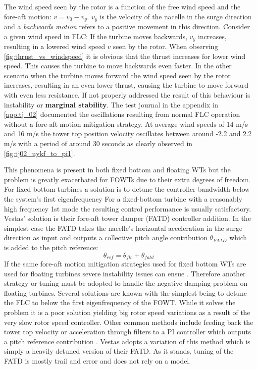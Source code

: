 The wind speed seen by the rotor is a function of the free wind speed and the fore-aft motion: $ v = v_0 - v_y $. $ v_y $ is the velocity of the nacelle in the surge direction and a \textit{backwards motion} refers to a positive movement in this direction. Consider a given wind speed in FLC: If the turbine moves backwards, $ v_y $ increases, resulting in a lowered wind speed $ v $ seen by the rotor. When observing \cref{fig:thrust_vs_windspeed} it is obvious that the thrust increases for lower wind speed. This causes the turbine to move backwards even faster. In the other scenario when the turbine moves forward the wind speed seen by the rotor increases, resulting in an even lower thrust, causing the turbine to move forward with even less resistance. If not properly addressed the result of this behaviour is instability or \textbf{marginal stability}. The test journal in the appendix in \cref{app:tj_02} documented the oscillations resulting from normal FLC operation without a fore-aft motion mitigation strategy. At average wind speeds of 14 m/s and 16 m/s the tower top position velocity oscillates between around -2.2 and 2.2 m/s with a period of around 30 seconds as clearly observed in \cref{fig:tj02_uykf_to_pi1}.

This phenomena is present in both fixed bottom and floating WTs but the problem is greatly exacerbated for FOWTs due to their extra degrees of freedom. For fixed bottom turbines a solution is to detune the controller bandwidth below the system's first eigenfrequency For a fixed-bottom turbine with a reasonably high frequency 1st mode the resulting control performance is usually satisfactory. Vestas' solution is their fore-aft tower damper (FATD) controller addition. In the simplest case the FATD takes the nacelle's horizontal acceleration in the surge direction as input and outputs a collective pitch angle contribution $ \theta_{FATD} $ which is added to the pitch reference:
\begin{equation}\label{eq:fatd}
	\theta_{ref} = \theta_{flc} + \theta_{fatd}
\end{equation}
If the same fore-aft motion mitigation strategies used for fixed bottom WTs are used for floating turbines severe instability issues can ensue \cite{Larsen2007}. Therefore another strategy or tuning must be adopted to handle the negative damping problem on floating turbines. Several solutions are known with the simplest being to detune the FLC to below the first eigenfrequency of the FOWT. While it solves the problem it is a poor solution yielding big rotor speed variations as a result of the very slow rotor speed controller. Other common methods include feeding back the tower top velocity or acceleration through filters to a PI controller which outputs a pitch reference contribution \cite{Grant2022}. Vestas adopts a variation of this method which is simply a heavily detuned version of their FATD. As it stands, tuning of the FATD is mostly trail and error and does not rely on a model.

